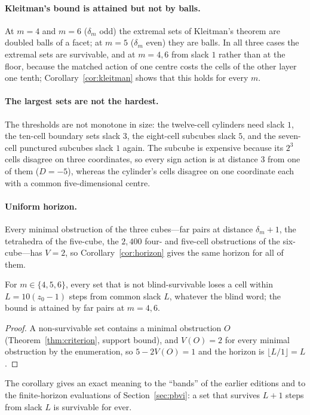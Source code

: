 \paragraph{Kleitman's bound is attained but not by balls.}
At $m=4$ and $m=6$ ($\delta_m$ odd) the extremal sets of Kleitman's theorem are doubled balls of a facet; at $m=5$ ($\delta_m$ even) they are balls. In all three cases the extremal sets are survivable, and at $m=4,6$ from slack $1$ rather than at the floor, because the matched action of one centre costs the cells of the other layer one tenth; Corollary~\ref{cor:kleitman} shows that this holds for every $m$.

\paragraph{The largest sets are not the hardest.}
The thresholds are not monotone in size: the twelve-cell cylinders need slack $1$, the ten-cell boundary sets slack $3$, the eight-cell subcubes slack $5$, and the seven-cell punctured subcubes slack $1$ again. The subcube is expensive because its $2^3$ cells disagree on three coordinates, so every sign action is at distance $3$ from one of them ($D=-5$), whereas the cylinder's cells disagree on one coordinate each with a common five-dimensional centre.

\paragraph{Uniform horizon.}
Every minimal obstruction of the three cubes---far pairs at distance $\delta_m+1$, the tetrahedra of the five-cube, the $2{,}400$ four- and five-cell obstructions of the six-cube---has $V=2$, so Corollary~\ref{cor:horizon} gives the same horizon for all of them.

\begin{corollary}\label{cor:uniform}
For $m\in\{4,5,6\}$, every set that is not blind-survivable loses a cell within $L=10(z_0-1)$ steps from common slack $L$, whatever the blind word; the bound is attained by far pairs at $m=4,6$.
\end{corollary}
\begin{proof}
A non-survivable set contains a minimal obstruction $O$ (Theorem~\ref{thm:criterion}, support bound), and $V(O)=2$ for every minimal obstruction by the enumeration, so $5-2V(O)=1$ and the horizon is $\lfloor L/1\rfloor=L$.
\end{proof}

The corollary gives an exact meaning to the ``bands'' of the earlier editions and to the finite-horizon evaluations of Section~\ref{sec:pbvi}: a set that survives $L+1$ steps from slack $L$ is survivable for ever.
